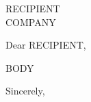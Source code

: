 \documentclass[11pt,letterpaper]{letter}
\begin{document}
\begin{letter}{ {{RECIPIENT}}\\{{COMPANY}} }
\opening{Dear {{RECIPIENT}},}

{{BODY}}

\closing{Sincerely,}

\end{letter}
\end{document}
